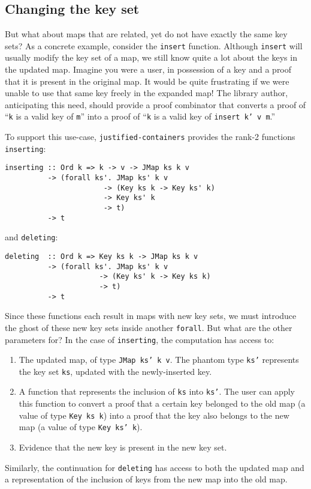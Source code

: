 \documentclass[format=sigplan, review=false, screen=true]{acmart}
\begin{document}
\subsection{Changing the key set}\label{changing-keys}
But what about maps that are related, yet do not have exactly the same key sets?
As a concrete example, consider the \texttt{insert} function. Although \texttt{insert} will usually
modify the key set of a map, we still know quite a lot about the keys in the updated map.
 Imagine you were a user, in possession of a key and a proof
that it is present in the original map. It would be quite frustrating if  we were
unable to use that same key freely in the expanded map!
The library author, anticipating this need, should provide a proof combinator that
converts a proof of ``\texttt{k} is a valid key of \texttt{m}'' into a proof of
``\texttt{k} is a valid key of \texttt{insert k' v m}.''

To support this use-case, \texttt{justified-containers} provides the rank-2
functions \texttt{inserting}:
\begin{verbatim}
inserting :: Ord k => k -> v -> JMap ks k v
          -> (forall ks'. JMap ks' k v
                       -> (Key ks k -> Key ks' k)
                       -> Key ks' k
                       -> t)
          -> t
\end{verbatim}
and \texttt{deleting}:
\begin{verbatim}
deleting  :: Ord k => Key ks k -> JMap ks k v
          -> (forall ks'. JMap ks' k v
                      -> (Key ks' k -> Key ks k)
                      -> t)
          -> t
\end{verbatim}
Since these functions each result in maps with new key sets, we must
introduce the ghost of these new key sets inside another \texttt{forall}.
But what are the other parameters for? In the case of \texttt{inserting},
the computation has access to:
\begin{enumerate}
\item The updated map, of type \texttt{JMap ks' k v}. The phantom type \texttt{ks'}
  represents the key set \texttt{ks}, updated with the newly-inserted key.
\item A function that represents the inclusion of \texttt{ks} into \texttt{ks'}.
  The user can apply this function to convert a proof that a certain key belonged to the
  old map (a value of type \texttt{Key ks k}) into a proof that the key also belongs to the new map (a value of type \texttt{Key ks' k}).
\item Evidence that the new key is present in the new key set.
\end{enumerate}
Similarly, the continuation for \texttt{deleting} has access to both the updated map
and a representation of the inclusion of keys from the new map into the old map.
\end{document}
